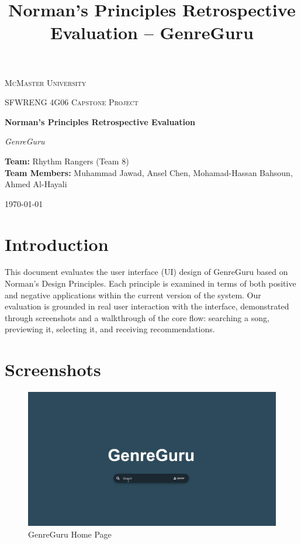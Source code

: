 \documentclass[12pt]{article}
\title{Norman’s Principles Retrospective Evaluation – GenreGuru}
\date{}
\begin{document}
\begin{titlepage}
    \centering
    {\scshape\LARGE McMaster University \par}
    \vspace{1cm}
    {\scshape\Large SFWRENG 4G06 Capstone Project\par}
    \vspace{1.5cm}
    {\huge\bfseries Norman’s Principles Retrospective Evaluation\par}
    \vspace{0.5cm}
    {\Large\itshape GenreGuru\par}
    \vfill
    \textbf{Team:} Rhythm Rangers (Team 8) \\
    \textbf{Team Members:} Muhammad Jawad, Ansel Chen, Mohamad-Hassan Bahsoun, Ahmed Al-Hayali \\
    \vfill
    {\large \today\par}
\end{titlepage}


\section*{Introduction}
This document evaluates the user interface (UI) design of GenreGuru based on Norman’s Design Principles. Each principle is examined in terms of both positive and negative applications within the current version of the system. Our evaluation is grounded in real user interaction with the interface, demonstrated through screenshots and a walkthrough of the core flow: searching a song, previewing it, selecting it, and receiving recommendations.

\section*{Screenshots}
\begin{figure}[H]
    \centering
    \includegraphics[width=\textwidth]{normans_principles_figures/img1.jpg}
    \caption{GenreGuru Home Page}
    \label{img1}
\end{figure}
\end{document}
